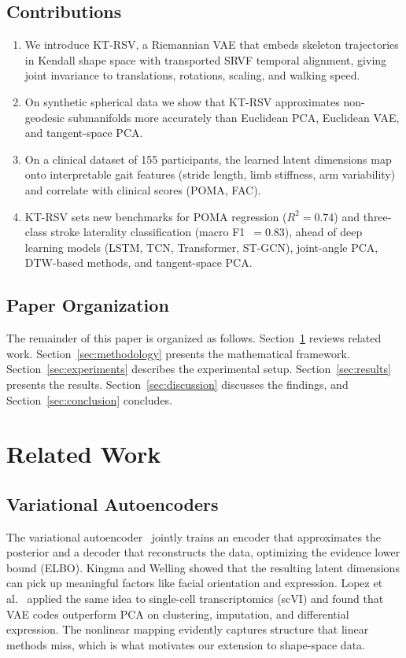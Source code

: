 \documentclass{article}
\begin{document}
\subsection{Contributions}
\begin{enumerate}
    \item We introduce KT-RSV, a Riemannian VAE that embeds skeleton trajectories in Kendall shape space with transported SRVF temporal alignment, giving joint invariance to translations, rotations, scaling, and walking speed.
    \item On synthetic spherical data we show that KT-RSV approximates non-geodesic submanifolds more accurately than Euclidean PCA, Euclidean VAE, and tangent-space PCA.
    \item On a clinical dataset of 155 participants, the learned latent dimensions map onto interpretable gait features (stride length, limb stiffness, arm variability) and correlate with clinical scores (POMA, FAC).
    \item KT-RSV sets new benchmarks for POMA regression ($R^2=0.74$) and three-class stroke laterality classification (macro F1~$=0.83$), ahead of deep learning models (LSTM, TCN, Transformer, ST-GCN), joint-angle PCA, DTW-based methods, and tangent-space PCA.
\end{enumerate}

\subsection{Paper Organization}
The remainder of this paper is organized as follows. Section~\ref{sec:related} reviews related work. Section~\ref{sec:methodology} presents the mathematical framework. Section~\ref{sec:experiments} describes the experimental setup. Section~\ref{sec:results} presents the results. Section~\ref{sec:discussion} discusses the findings, and Section~\ref{sec:conclusion} concludes.

\section{Related Work}
\label{sec:related}

\subsection{Variational Autoencoders}
The variational autoencoder~\cite{kingma2013auto} jointly trains an encoder that approximates the posterior and a decoder that reconstructs the data, optimizing the evidence lower bound (ELBO). Kingma and Welling showed that the resulting latent dimensions can pick up meaningful factors like facial orientation and expression. Lopez et al.~\cite{lopez2018deep} applied the same idea to single-cell transcriptomics (scVI) and found that VAE codes outperform PCA on clustering, imputation, and differential expression. The nonlinear mapping evidently captures structure that linear methods miss, which is what motivates our extension to shape-space data.
\end{document}
